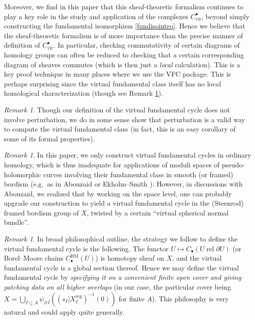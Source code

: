 \documentclass[12pt]{article}
\theoremstyle{definition}
\theoremstyle{remark}
\newtheorem{remark}[theorem]{Remark}
\numberwithin{equation}{subsection}
\newcommand{\vir}{\mathrm{vir}}
\newcommand{\reg}{\mathrm{reg}}
\newcommand{\rel}{\operatorname{rel}}
\begin{document}
Moreover, we find in this paper that this sheaf-theoretic formalism continues to play a key role in the study and application of the complexes $C^\bullet_\vir$, beyond simply constructing the fundamental isomorphism \eqref{fundisointro}.  Hence we believe that the sheaf-theoretic formalism is of more importance than the precise manner of definition of $C^\bullet_\vir$.  In particular, checking commutativity of certain diagrams of homology groups can often be reduced to checking that a certain corresponding diagram of sheaves commutes (which is then just a \emph{local} calculation).  This is a key proof technique in many places where we use the VFC package.  This is perhaps surprising since the virtual fundamental class itself has no local homological characterization (though see Remark \ref{chainsishomotopysheaf}).

\begin{remark}
Though our definition of the virtual fundamental cycle does not involve perturbation, we do in some sense show that perturbation is a valid way to compute the virtual fundamental class (in fact, this is an easy corollary of some of its formal properties).
\end{remark}

\begin{remark}\label{smoothcandomaybe}
In this paper, we only construct virtual fundamental cycles in ordinary homology, which is thus inadequate for applications of moduli spaces of pseudo-holomorphic curves involving their fundamental class in smooth (or framed) bordism (e.g.\ as in Abouzaid \cite{abouzaid} or Ekholm--Smith \cite{ekholmsmith}).  However, in discussions with Abouzaid, we realized that by working on the space level, one can probably upgrade our construction to yield a virtual fundamental cycle in the (Steenrod) framed bordism group of $X$, twisted by a certain ``virtual spherical normal bundle''.
\end{remark}

\begin{remark}\label{chainsishomotopysheaf}
In broad philosophical outline, the strategy we follow to define the virtual fundamental cycle is the following.  The functor $U\mapsto C_\bullet(U\rel\partial U)$ (or Borel--Moore chains $C_\bullet^\mathrm{BM}(U)$) is homotopy sheaf on $X$, and the virtual fundamental cycle is a global section thereof.  Hence we may define the virtual fundamental cycle by \emph{specifying it on a convenient finite open cover and giving patching data on all higher overlaps} (in our case, the particular cover being $X=\bigcup_{I\subseteq A}\psi_{\varnothing I}((s_I|X_I^\reg)^{-1}(0))$ for finite $A$).  This philosophy is very natural and could apply quite generally.
\end{remark}
\end{document}
